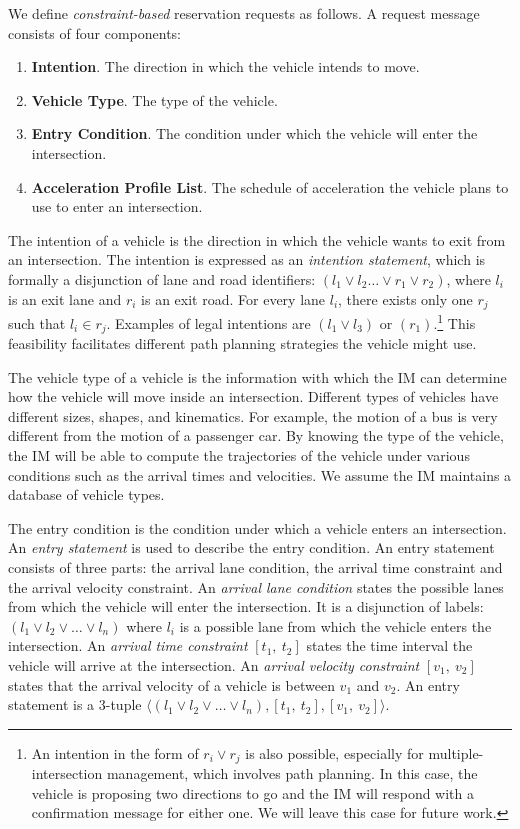 We define \emph{constraint-based} reservation requests as follows.
A request message consists of four components:
\begin{enumerate}
\item{\bf Intention}. The direction in which the vehicle intends to
  move.
\item{\bf Vehicle Type}. The type of the vehicle.
\item{\bf Entry Condition}. The condition under which the vehicle
  will enter the intersection.
\item{\bf Acceleration Profile List}. The schedule of acceleration
  the vehicle plans to use to enter an intersection.
\end{enumerate}
The intention of a vehicle is the direction in which the vehicle wants
to exit from an intersection.  The intention is expressed as an
\emph{intention statement}, which is formally a disjunction of lane
and road identifiers: $(l_1 \vee l_2 \ldots \vee r_1 \vee r_2)$, where
$l_i$ is an exit lane and $r_i$ is an exit road. For every lane $l_i$,
there exists only one $r_j$ such that $l_i \in r_j$. 
Examples of legal intentions are $(l_1 \vee l_3)$ or
$(r_1)$.\footnote{An intention in the form of $r_i \vee r_j$ is also possible,
especially for multiple-intersection management, which involves path
planning. In this case, the vehicle is proposing two directions to go
and the IM will respond with a confirmation message for either one. We
will leave this case for future work.}
This feasibility facilitates different path planning strategies the
vehicle might use.

The vehicle type of a vehicle is the information with which the IM can
determine how the vehicle will move inside an intersection.  Different
types of vehicles have different sizes, shapes, and kinematics.  For
example, the motion of a bus is very different from the motion of a
passenger car.  By knowing the type of the vehicle, the IM will be
able to compute the trajectories of the vehicle under various conditions
such as the arrival times and velocities. We assume the IM maintains
a database of vehicle types.

The entry condition is the condition under which a vehicle enters an
intersection.  An \emph{entry statement} is used to describe the entry
condition. An entry statement consists of three parts: the arrival
lane condition, the arrival time constraint and the arrival velocity
constraint.  An \emph{arrival lane condition} states the possible lanes
from which the vehicle will enter the intersection.  It is a disjunction of
labels: $(l_1 \vee l_2 \vee \ldots \vee l_n)$ where $l_i$ is a
possible lane from which the vehicle enters the intersection.  An
\emph{arrival time constraint} $[t_1,\ t_2]$ states the time interval
the vehicle will arrive at the intersection.  An \emph{arrival
velocity constraint} $[v_1,\ v_2]$ states that the arrival velocity of
a vehicle is between $v_1$ and $v_2$.  An entry statement is a
$3$-tuple $\langle (l_1 \vee l_2 \vee \ldots \vee l_n), [t_1,\ t_2],
[v_1,\ v_2] \rangle$.

